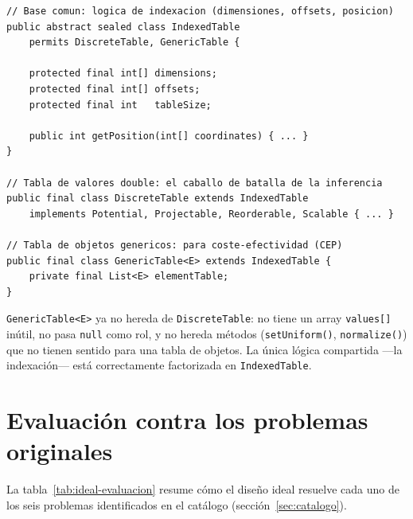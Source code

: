\documentclass[11pt,a4paper]{article}
\newcommand{\code}[1]{\texttt{#1}}
\begin{document}
\begin{lstlisting}[caption={Jerarquía limpia con \code{IndexedTable} como base}]
// Base comun: logica de indexacion (dimensiones, offsets, posicion)
public abstract sealed class IndexedTable
    permits DiscreteTable, GenericTable {

    protected final int[] dimensions;
    protected final int[] offsets;
    protected final int   tableSize;

    public int getPosition(int[] coordinates) { ... }
}

// Tabla de valores double: el caballo de batalla de la inferencia
public final class DiscreteTable extends IndexedTable
    implements Potential, Projectable, Reorderable, Scalable { ... }

// Tabla de objetos genericos: para coste-efectividad (CEP)
public final class GenericTable<E> extends IndexedTable {
    private final List<E> elementTable;
}
\end{lstlisting}

\code{GenericTable<E>} ya no hereda de \code{DiscreteTable}: no tiene
un array \code{values[]} inútil, no pasa \code{null} como rol, y no
hereda métodos (\code{setUniform()}, \code{normalize()}) que no tienen
sentido para una tabla de objetos.  La única lógica compartida ---la
indexación--- está correctamente factorizada en \code{IndexedTable}.

\section{Evaluación contra los problemas originales}
\label{sec:ideal-evaluacion}

La tabla~\ref{tab:ideal-evaluacion} resume cómo el diseño ideal resuelve
cada uno de los seis problemas identificados en el catálogo
(sección~\ref{sec:catalogo}).
\end{document}
